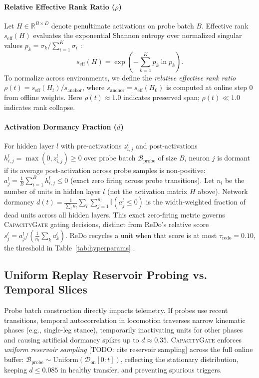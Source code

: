 \documentclass{article}
\begin{document}
\paragraph{Relative Effective Rank Ratio ($\rho$)}
Let $H \in \mathbb{R}^{B \times D}$ denote penultimate activations on probe batch $B$. Effective rank $s_{\mathrm{eff}}(H)$ evaluates the exponential Shannon entropy over normalized singular values $p_k = \sigma_k / \sum_{i=1}^K \sigma_i$ \citep{roy2007effective, kumar2020implicit}:
\begin{equation}
    s_{\mathrm{eff}}(H) = \exp\left( -\sum_{k=1}^K p_k \ln p_k \right).
\end{equation}
To normalize across environments, we define the \emph{relative effective rank ratio} $\rho(t) = s_{\mathrm{eff}}(H_t) / s_{\mathrm{anchor}}$, where $s_{\mathrm{anchor}} = s_{\mathrm{eff}}(H_0)$ is computed at online step 0 from offline weights. Here $\rho(t) \approx 1.0$ indicates preserved span; $\rho(t) \ll 1.0$ indicates rank collapse.

\paragraph{Activation Dormancy Fraction ($d$)}
For hidden layer $l$ with pre-activations $z_{i,j}^l$ and post-activations $h_{i,j}^l = \max(0, z_{i,j}^l) \ge 0$ over probe batch $\mathcal{B}_{\mathrm{probe}}$ of size $B$, neuron $j$ is dormant if its average post-activation across probe samples is non-positive: $a_j^l = \frac{1}{B} \sum_{i=1}^B h_{i,j}^l \le 0$ (exact zero firing across probe transitions). Let $n_l$ be the number of units in hidden layer $l$ (not the activation matrix $H$ above). Network dormancy $d(t) = \frac{1}{\sum_l n_l} \sum_l \sum_{j=1}^{n_l} \mathbb{I}(a_j^l \le 0)$ is the width-weighted fraction of dead units across all hidden layers. This exact zero-firing metric governs \textsc{CapacityGate} gating decisions, distinct from ReDo's relative score $s_j^l = a_j^l / (\frac{1}{n_l}\sum_k a_k^l)$. ReDo recycles a unit when that score is at most $\tau_{\mathrm{redo}} = 0.10$, the threshold in Table~\ref{tab:hyperparams} \citep{sokar2023dormant}.

\subsection{Uniform Replay Reservoir Probing vs. Temporal Slices}
\label{sec:probe_sampling}

Probe batch construction directly impacts telemetry. If probes use recent transitions, temporal autocorrelation in locomotion traverses narrow kinematic phases (e.g., single-leg stance), temporarily inactivating units for other phases and causing artificial dormancy spikes up to $d \approx 0.35$. \textsc{CapacityGate} enforces \emph{uniform reservoir sampling} [TODO: cite reservoir sampling] across the full online buffer: $\mathcal{B}_{\mathrm{probe}} \sim \mathrm{Uniform}(\mathcal{D}_{\mathrm{on}}[0:t])$, reflecting the stationary distribution, keeping $d \le 0.085$ in healthy transfer, and preventing spurious triggers.
\end{document}
